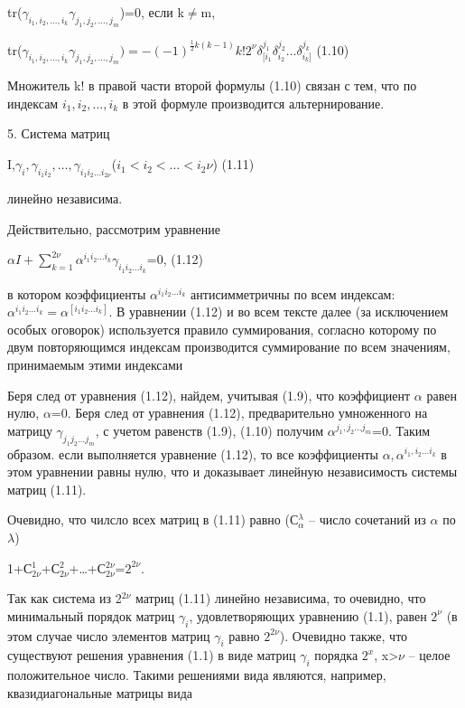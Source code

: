 \documentclass{article}
\begin{document}
{tr($\gamma_{i_1,i_2,\dots, i_k}\gamma_{j_1,j_2,\dots,j_m}$)=0, если k$\ne$m,\par
tr($\gamma_{i_1,i_2,\dots, i_k}\gamma_{j_1,j_2,\dots,j_m})=-(-1)^{{\frac{1}{2}}k(k-1)}k!2^\nu\delta^{j_1}_{[{i_1}}\delta^{j_2}_{i_2}\dots\delta^{j_k}_{i_k]}$ (1.10)\par
Множитель k! в правой части второй формулы (1.10) связан с тем, что по индексам $i_1,i_2,\dots,i_k$ в этой формуле производится альтернирование.\par
5. Система матриц\par
\begin{center}
I,$\gamma_i,\gamma_{i_1 i_2},\dots,\gamma_{i_1 i_2\dots i_{2\nu}}$\hspace{0.2cm}($i_1<i_2<\dots<i_2\nu$)\hspace{0.2cm} (1.11)\par
\end{center}
линейно независима.\par
Действительно, рассмотрим уравнение
\begin{center}
$\alpha I+\sum_{k=1}^{2\nu}\alpha^{i_1 i_2\dots i_k}\gamma_{i_1 i_2\dots i_k}$=0,    (1.12)\par
\end{center}
в котором коэффициенты $\alpha^{i_1 i_2\dots i_k}$ антисимметричны по всем индексам: $\alpha^{i_1 i_2\dots i_k}=\alpha^{[i_1 i_2\dots i_k]}$. В уравнении (1.12) и во всем тексте далее (за исключением особых оговорок) используется правило суммирования, согласно которому по двум повторяющимся индексам производится суммирование по всем значениям, принимаемым этими индексами\par
Беря след от уравнения (1.12), найдем, учитывая (1.9), что коэффициент $\alpha$ равен нулю, $\alpha$=0. Беря след от уравнения (1.12), предварительно умноженного на матрицу $\gamma_{j_1 j_2 \dots j_m}$, с учетом равенств (1.9), (1.10) получим $\alpha^{j_1,j_2\dots j_m}$=0. Таким образом. если выполняется уравнение (1.12), то все коэффициенты $\alpha,\alpha^{i_1,i_2\dots i_k}$ в этом уравнении равны нулю, что и доказывает линейную независимость системы матриц (1.11).\par
Очевидно, что чилсло всех матриц в (1.11) равно (С$^{\lambda}_{\alpha}$ -- число сочетаний из $\alpha$ по $\lambda$)\par
\begin{center}
1+С$^{1}_{2\nu}$+С$^{2}_{2\nu}$+\dots+С$^{2\nu}_{2\nu}$=$2^{2\nu}$.\par
\end{center}
Так как система из 2$^{2\nu}$ матриц (1.11) линейно независима, то очевидно, что минимальный порядок матриц $\gamma_i$, удовлетворяющих уравнению (1.1), равен $2^\nu$ (в этом случае число элементов матриц $\gamma_i$ равно $2^{2\nu}$). Очевидно также, что существуют решения уравнения (1.1) в виде матриц $\gamma_i$ порядка $2^x$, x>$\nu$ -- целое положительное число. Такими решениями вида являются, например, квазидиагональные матрицы вида\par
}
\end{document}
